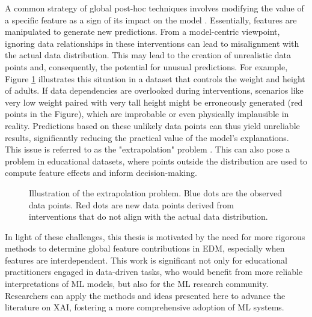 A common strategy of global post-hoc techniques involves modifying the value of a specific feature as a sign of its impact on the model \cite{Scholbeck2020SamplingInterpretations}. Essentially, features are manipulated to generate new predictions. From a model-centric viewpoint, ignoring data relationships in these interventions can lead to misalignment with the actual data distribution. This may lead to the creation of unrealistic data points and, consequently, the potential for unusual predictions. For example, Figure \ref{fig:extrapolation_introduction} illustrates this situation in a dataset that controls the weight and height of adults.  If data dependencies are overlooked during interventions, scenarios like very low weight paired with very tall height might be erroneously generated (red points in the Figure), which are improbable or even physically implausible in reality. Predictions based on these unlikely data points can thus yield unreliable results, significantly reducing the practical value of the model's explanations. This issue is referred to as the "extrapolation" problem \cite{Molnar2022GeneralModels, Rudin2019StopInstead}. This can also pose a problem in educational datasets, where points outside the distribution are used to compute feature effects and inform decision-making. 

\begin{figure}[ht!]
\centering
  \caption{Illustration of the extrapolation problem. Blue dots are the observed data points. Red dots are new data points derived from interventions that do not align with the actual data distribution.}
    \label{fig:extrapolation_introduction}
\end{figure}

 
In light of these challenges, this thesis is motivated by the need for more rigorous methods to determine global feature contributions in EDM, especially when features are interdependent. This work is significant not only for educational practitioners engaged in data-driven tasks, who would benefit from more reliable interpretations of ML models, but also for the ML research community. Researchers can apply the methods and ideas presented here to advance the literature on XAI, fostering a more comprehensive adoption of ML systems.
